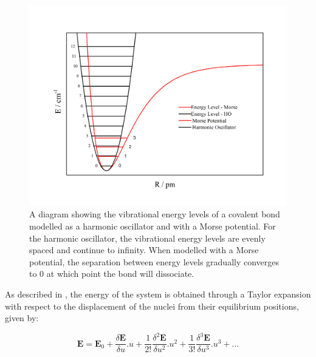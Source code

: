 \begin{figure}[t]
    \centering
    \includegraphics{Figures/Misc/QHA/MorsePotential.png}
    \captionsetup{font = footnotesize, justification = centering}
    \caption[The Harmonic Oscillator and Morse Potential]{A diagram showing the vibrational energy levels of a covalent bond modelled as a harmonic oscillator and with a Morse potential. For the harmonic oscillator, the vibrational energy levels are evenly spaced and continue to infinity. When modelled with a Morse potential, the separation between energy levels gradually converges to 0 at which point the bond will dissociate.}
    \label{fig:SHO_morse}
\end{figure}

As described in , the energy of the system is obtained through a Taylor expansion with respect to the displacement of the nuclei from their equilibrium positions, given by:

\begin{equation}
\boldsymbol{E} = \boldsymbol{E}_0 + \frac{\delta \boldsymbol{E}}{\delta u}.u + \frac{1}{2!} \frac{\delta^2 \boldsymbol{E}}{\delta u^2}.u^2 + \frac{1}{3!} \frac{\delta^3 \boldsymbol{E}}{\delta u^3}.u^3 + ...
\label{eqn:ETaylor2}
\end{equation}


